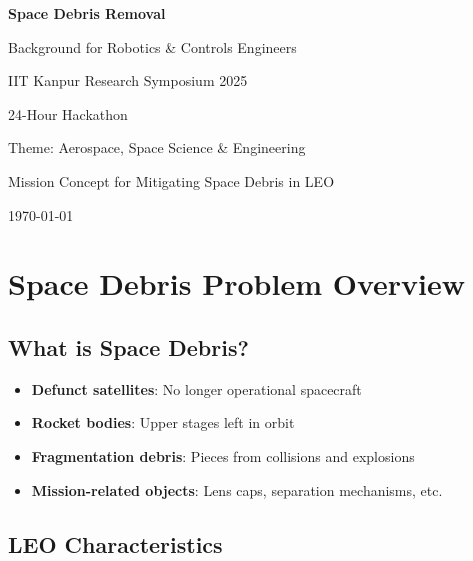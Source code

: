 \documentclass[11pt,a4paper]{article}
\begin{document}
\begin{titlepage}
    \centering
    \vspace*{2cm}

    {\Huge\bfseries\color{titlecolor} Space Debris Removal\par}
    \vspace{0.5cm}
    {\LARGE\color{sectioncolor} Background for Robotics \& Controls Engineers\par}
    \vspace{2cm}

    {\Large IIT Kanpur Research Symposium 2025\par}
    \vspace{0.5cm}
    {\large 24-Hour Hackathon\par}

    \vfill

    {\large Theme: Aerospace, Space Science \& Engineering\par}
    \vspace{0.5cm}
    {\large Mission Concept for Mitigating Space Debris in LEO\par}

    \vspace{1cm}
    {\large \today\par}
\end{titlepage}

\tableofcontents
\newpage

\section{Space Debris Problem Overview}

\subsection{What is Space Debris?}

\begin{itemize}[leftmargin=*]
    \item \textbf{Defunct satellites}: No longer operational spacecraft
    \item \textbf{Rocket bodies}: Upper stages left in orbit
    \item \textbf{Fragmentation debris}: Pieces from collisions and explosions
    \item \textbf{Mission-related objects}: Lens caps, separation mechanisms, etc.
\end{itemize}

\subsection{LEO Characteristics}
\end{document}

